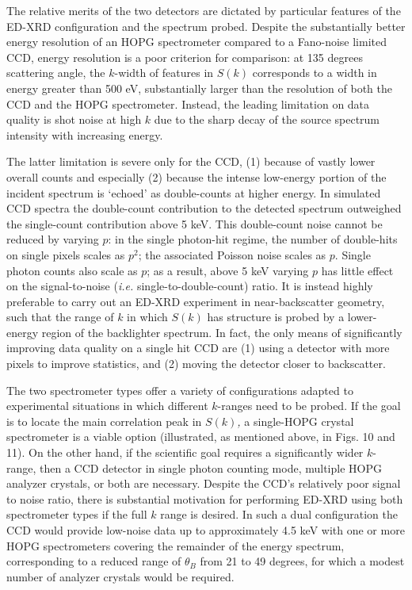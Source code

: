 The relative merits of the two detectors are dictated by particular
features of the ED-XRD configuration and the spectrum probed. Despite
the substantially better energy resolution of an HOPG spectrometer
compared to a Fano-noise limited CCD, energy resolution is a poor
criterion for comparison: at 135 degrees scattering angle, the
\(k\)-width of features in \(S(k)\) corresponds to a width in energy
greater than 500 eV, substantially larger than the resolution of both
the CCD and the HOPG spectrometer. Instead, the leading limitation on
data quality is shot noise at high \(k\) due to the sharp decay of the
source spectrum intensity with increasing energy.

The latter limitation is severe only for the CCD, (1) because of vastly
lower overall counts and especially (2) because the intense low-energy
portion of the incident spectrum is `echoed' as double-counts at higher
energy. In simulated CCD spectra the double-count contribution to the
detected spectrum outweighed the single-count contribution above 5 keV.
This double-count noise cannot be reduced by varying \(p\): in the
single photon-hit regime, the number of double-hits on single pixels
scales as \(p^{2}\); the associated Poisson noise scales as \(p\).
Single photon counts also scale as \(p\); as a result, above 5 keV
varying \(p\) has little effect on the signal-to-noise (\emph{i.e.}
single-to-double-count) ratio. It is instead highly preferable to carry
out an ED-XRD experiment in near-backscatter geometry, such that the
range of \(k\) in which \(S(k)\) has structure is probed by a
lower-energy region of the backlighter spectrum. In fact, the only means
of significantly improving data quality on a single hit CCD are (1)
using a detector with more pixels to improve statistics, and (2) moving
the detector closer to backscatter.

The two spectrometer types offer a variety of configurations adapted to
experimental situations in which different \(k\)-ranges need to be
probed. If the goal is to locate the main correlation peak in
\(S(k)\)\emph{,} a single-HOPG crystal spectrometer is a viable option
(illustrated, as mentioned above, in Figs. 10 and 11). On the other
hand, if the scientific goal requires a significantly wider \(k\)-range,
then a CCD detector in single photon counting mode, multiple HOPG
analyzer crystals, or both are necessary. Despite the CCD's relatively
poor signal to noise ratio, there is substantial motivation for
performing ED-XRD using both spectrometer types if the full \(k\) range
is desired. In such a dual configuration the CCD would provide low-noise
data up to approximately 4.5 keV with one or more HOPG spectrometers
covering the remainder of the energy spectrum, corresponding to a
reduced range of \(\theta_{B}\) from 21 to 49 degrees, for which a
modest number of analyzer crystals would be required.

